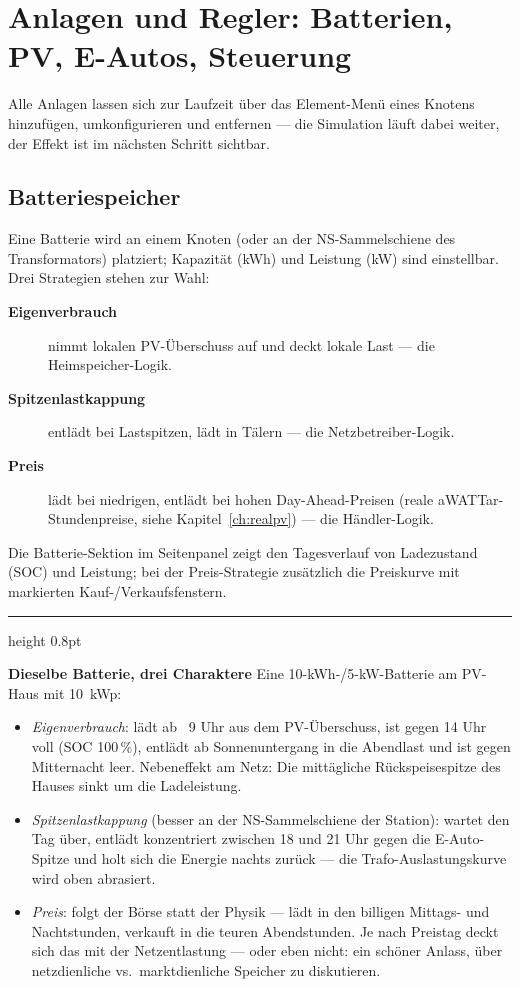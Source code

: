 \documentclass[11pt,a4paper,parskip=half]{scrreprt}
\newcommand{\ui}[1]{\textsf{\bfseries #1}}          %
\newenvironment{beispiel}[1][Beispiel]
  {\par\medskip
   {\color{bsp}\hrule height 0.8pt}\nopagebreak\smallskip
   \noindent\textbf{\textsf{\textcolor{bsp}{#1}}}\quad\ignorespaces}
  {\par\nopagebreak\smallskip{\color{bsp}\hrule height 0.8pt}\par\medskip}
\begin{document}
\chapter{Anlagen und Regler: Batterien, PV, E-Autos, Steuerung}
\label{ch:der}

Alle Anlagen lassen sich zur Laufzeit über das Element-Menü eines
Knotens hinzufügen, umkonfigurieren und entfernen --- die Simulation
läuft dabei weiter, der Effekt ist im nächsten Schritt sichtbar.

\section{Batteriespeicher}

Eine Batterie wird an einem Knoten (oder an der NS-Sammelschiene des
Transformators) platziert; Kapazität (kWh) und Leistung (kW) sind
einstellbar. Drei Strategien stehen zur Wahl:

\begin{description}
  \item[\ui{Eigenverbrauch}] nimmt lokalen PV-Überschuss auf und
    deckt lokale Last --- die Heimspeicher-Logik.
  \item[\ui{Spitzenlastkappung}] entlädt bei Lastspitzen, lädt in
    Tälern --- die Netzbetreiber-Logik.
  \item[\ui{Preis}] lädt bei niedrigen, entlädt bei hohen
    Day-Ahead-Preisen (reale aWATTar-Stundenpreise, siehe
    Kapitel~\ref{ch:realpv}) --- die Händler-Logik.
\end{description}

Die Batterie-Sektion im Seitenpanel zeigt den Tagesverlauf von
Ladezustand (SOC) und Leistung; bei der Preis-Strategie zusätzlich
die Preiskurve mit markierten Kauf-/Verkaufsfenstern.

\begin{beispiel}[Dieselbe Batterie, drei Charaktere]
Eine 10-kWh-/5-kW-Batterie am PV-Haus mit 10~kWp:
\begin{itemize}[nosep]
  \item \emph{Eigenverbrauch}: lädt ab ~9 Uhr aus dem
    PV-Überschuss, ist gegen 14 Uhr voll (SOC 100\,\%), entlädt ab
    Sonnenuntergang in die Abendlast und ist gegen Mitternacht
    leer. Nebeneffekt am Netz: Die mittägliche Rückspeisespitze des
    Hauses sinkt um die Ladeleistung.
  \item \emph{Spitzenlastkappung} (besser an der NS-Sammelschiene
    der Station): wartet den Tag über, entlädt konzentriert
    zwischen 18 und 21 Uhr gegen die E-Auto-Spitze und holt sich
    die Energie nachts zurück --- die Trafo-Auslastungskurve wird
    oben \glqq abrasiert\grqq.
  \item \emph{Preis}: folgt der Börse statt der Physik --- lädt in
    den billigen Mittags- und Nachtstunden, verkauft in die teuren
    Abendstunden. Je nach Preistag deckt sich das mit der
    Netzentlastung --- oder eben nicht: ein schöner Anlass, über
    netzdienliche vs.\ marktdienliche Speicher zu diskutieren.
\end{itemize}
\end{beispiel}
\end{document}
